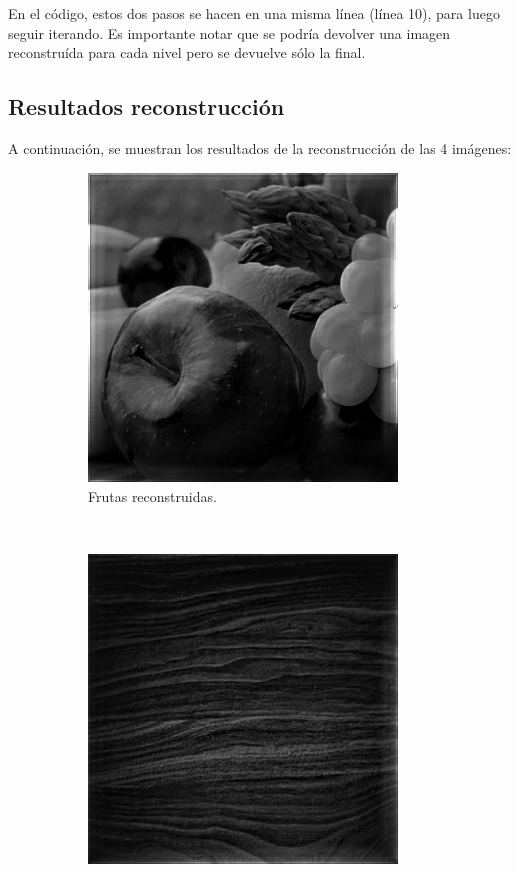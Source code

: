 \documentclass[12pt, letterpaper]{article}
\begin{document}
En el código, estos dos pasos se hacen en una misma línea (línea 10), para luego seguir iterando. Es importante notar que se podría devolver una imagen reconstruída para cada nivel pero se devuelve sólo la final. 


\subsection{Resultados reconstrucción}
A continuación, se muestran los resultados de la reconstrucción de las 4 imágenes:

\begin{figure}[H]
  \centering
  \begin{subfigure}[t]{0.46\textwidth}
    \centering
    \includegraphics[width = 0.9\textwidth]{frutas/reconstr.png}
    \caption{Frutas reconstruidas.}
  \end{subfigure}
  ~ 
  \begin{subfigure}[t]{0.46\textwidth}
      \centering
      \includegraphics[width = 0.9\textwidth]{madera/reconstr.png}

\end{subfigure}
\end{figure}
\end{document}
